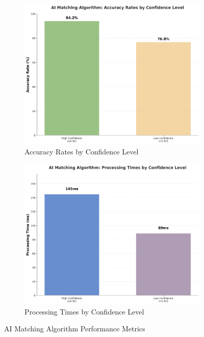 \begin{figure}[htbp]
    \centering
    \begin{subfigure}[t]{0.48\textwidth}
        \centering
        \includegraphics[width=\textwidth]{figs/chapter4/ai_accuracy_rates.png}
        \caption{Accuracy Rates by Confidence Level}
        \label{fig:ai_accuracy}
    \end{subfigure}
    \hfill
    \begin{subfigure}[t]{0.48\textwidth}
        \centering
        \includegraphics[width=\textwidth]{figs/chapter4/ai_processing_times.png}
        \caption{Processing Times by Confidence Level}
        \label{fig:ai_processing}
    \end{subfigure}
    \caption{AI Matching Algorithm Performance Metrics}
    \label{fig:ai_matching_system}
\end{figure}

